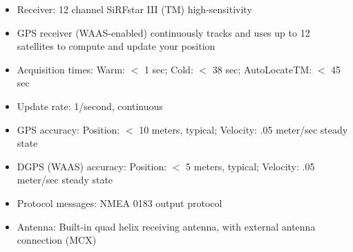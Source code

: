 \begin{itemize}
\begin{itemize}
			\item Receiver: 12 channel SiRFstar III (TM) high-sensitivity 
			\item GPS receiver (WAAS-enabled) continuously tracks and uses up to 12 satellites to compute and update your position 
			\item Acquisition times: Warm: $<$ 1 sec; Cold: $<$ 38 sec; AutoLocateTM: $<$ 45 sec 
			\item Update rate: 1/second, continuous 
			\item GPS accuracy: Position: $<$ 10 meters, typical; Velocity: .05 meter/sec steady state 
			\item DGPS (WAAS) accuracy: Position: $<$ 5 meters, typical; Velocity: .05 meter/sec steady state 
			\item Protocol messages: NMEA 0183 output protocol 
			\item Antenna: Built-in quad helix receiving antenna, with external antenna connection (MCX)
		\end{itemize}
\end{itemize}
